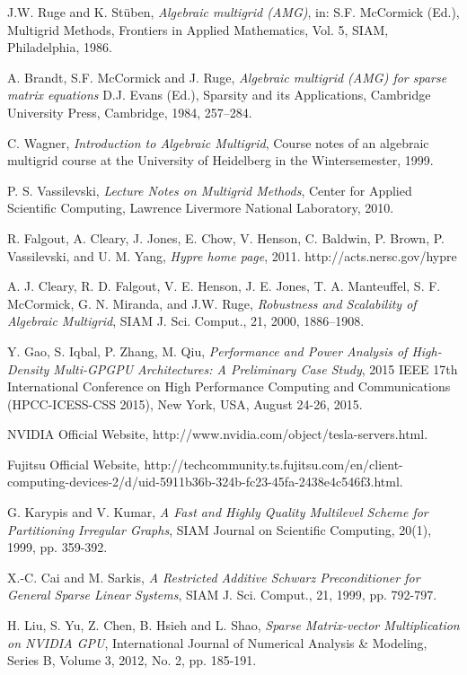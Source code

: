 \documentclass[runningheads,a4paper]{llncs}
\begin{document}
{\begin{thebibliography}{4}
{J.W. Ruge and K. St\"{u}ben},
\emph{Algebraic multigrid (AMG)},
in: S.F. McCormick (Ed.), Multigrid Methods, Frontiers in Applied Mathematics, Vol. 5, SIAM, Philadelphia, 1986.

{A. Brandt, S.F. McCormick and J. Ruge},
\emph{Algebraic multigrid (AMG) for sparse matrix equations}
D.J. Evans (Ed.), Sparsity and its Applications, Cambridge University Press, Cambridge, 1984, 257--284.

{C. Wagner},
\emph{Introduction to Algebraic Multigrid},
Course notes of an algebraic multigrid course at the University of Heidelberg in the Wintersemester, 1999.

{P. S. Vassilevski},
\emph{Lecture Notes on Multigrid Methods},
Center for Applied Scientific Computing, Lawrence Livermore National Laboratory, 2010.

{R. Falgout, A. Cleary, J. Jones, E. Chow, V. Henson, C. Baldwin,
P. Brown, P. Vassilevski, and U. M. Yang},
\emph{Hypre home page}, 2011.
{http://acts.nersc.gov/hypre}

{A. J. Cleary, R. D. Falgout, V. E. Henson, J. E. Jones, T. A. Manteuffel, S. F. McCormick,
G. N. Miranda, and J.W. Ruge},
\emph{Robustness and Scalability of Algebraic Multigrid}, SIAM J. Sci. Comput., 21, 2000, 1886--1908.

 Y. Gao, S. Iqbal, P. Zhang, M. Qiu,
\emph{Performance and Power Analysis of High-Density Multi-GPGPU Architectures: A Preliminary Case Study},
2015 IEEE 17th International Conference on High Performance Computing and Communications (HPCC-ICESS-CSS 2015), New York, USA, August 24-26, 2015.

NVIDIA Official Website, {http://www.nvidia.com/object/tesla-servers.html}.

Fujitsu Official Website,
{http://techcommunity.ts.fujitsu.com/en/client-computing-devices-2/d/uid-5911b36b-324b-fc23-45fa-2438e4c546f3.html}.

 G. Karypis and V. Kumar,
\emph{A Fast and Highly Quality Multilevel Scheme for Partitioning Irregular Graphs},
SIAM Journal on Scientific Computing, 20(1), 1999, pp. 359-392.

 X.-C. Cai and M. Sarkis,
{\it A Restricted Additive Schwarz Preconditioner for General Sparse Linear Systems},
SIAM J. Sci. Comput., 21, 1999, pp. 792-797.

 H. Liu, S. Yu, Z. Chen, B. Hsieh and L. Shao,
\emph{Sparse Matrix-vector Multiplication on NVIDIA GPU},
International Journal of Numerical Analysis \& Modeling, Series B, Volume 3, 2012, No. 2, pp. 185-191.


\end{thebibliography}}
\end{document}
